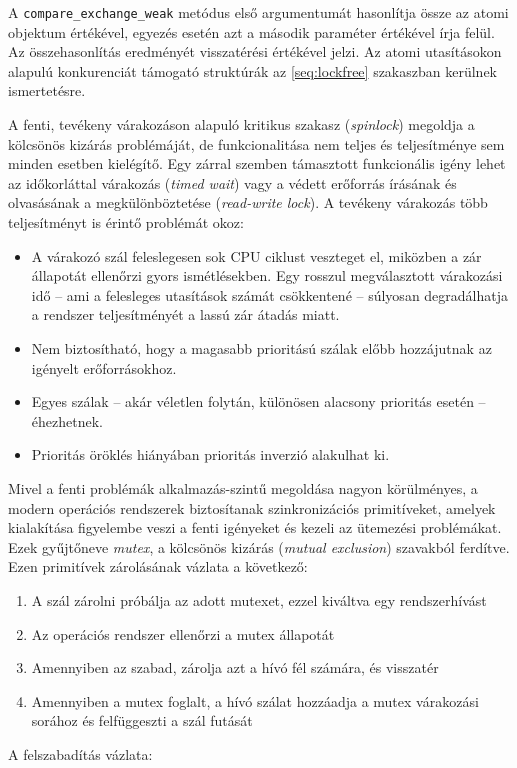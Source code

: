     
    A \texttt{compare\_exchange\_weak} metódus első argumentumát hasonlítja össze az atomi objektum értékével, egyezés esetén azt a második paraméter értékével írja felül. Az összehasonlítás eredményét visszatérési értékével jelzi. Az atomi utasításokon alapulú konkurenciát támogató struktúrák az \ref{seq:lockfree} szakaszban kerülnek ismertetésre.
    
    A fenti, tevékeny várakozáson alapuló kritikus szakasz (\emph{spinlock}) megoldja a kölcsönös kizárás problémáját, de funkcionalitása nem teljes és teljesítménye sem minden esetben kielégítő. Egy zárral szemben támasztott funkcionális igény lehet az időkorláttal várakozás (\emph{timed wait}) vagy a védett erőforrás írásának és olvasásának a megkülönböztetése (\emph{read-write lock}). A tevékeny várakozás több teljesítményt is érintő problémát okoz:
    
    \begin{itemize} 
        \item A várakozó szál feleslegesen sok CPU ciklust veszteget el, miközben a zár állapotát ellenőrzi gyors ismétlésekben. Egy rosszul megválasztott várakozási idő -- ami a felesleges utasítások számát csökkentené -- súlyosan degradálhatja a rendszer teljesítményét a lassú zár átadás miatt.
        \item Nem biztosítható, hogy a magasabb prioritású szálak előbb hozzájutnak az igényelt erőforrásokhoz.
        \item Egyes szálak -- akár véletlen folytán, különösen alacsony prioritás esetén -- éhezhetnek.
        \item Prioritás öröklés hiányában prioritás inverzió alakulhat ki.
    \end{itemize}
%
    Mivel a fenti problémák alkalmazás-szintű megoldása nagyon körülményes, a modern operációs rendszerek biztosítanak szinkronizációs primitíveket, amelyek kialakítása figyelembe veszi a fenti igényeket és kezeli az ütemezési problémákat. Ezek gyűjtőneve \emph{mutex}, a kölcsönös kizárás (\emph{mutual exclusion}) szavakból ferdítve. Ezen primitívek zárolásának vázlata a következő:
    
    \begin{enumerate}
        \item A szál zárolni próbálja az adott mutexet, ezzel kiváltva egy rendszerhívást
        \item Az operációs rendszer ellenőrzi a mutex állapotát
        \item Amennyiben az szabad, zárolja azt a hívó fél számára, és visszatér
        \item Amennyiben a mutex foglalt, a hívó szálat hozzáadja a mutex várakozási sorához és felfüggeszti a szál futását
    \end{enumerate}
%    
    A felszabadítás vázlata:
    
